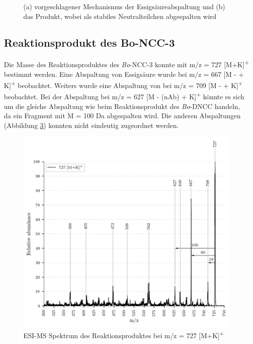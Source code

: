 \begin{figure}[!htbp]
\begin{subfigure}[b]{0.5\textwidth}
    \caption{}
    \label{fig:699MK639}
  \end{subfigure}
  \caption[Vorschlag des Mechanismus der  Abspaltung, Quelle: Autor]{(a) vorgeschlagener Mechanismus der Essigsäureabspaltung und (b) das Produkt, wobei  als stabiles Neutralteilchen abgespalten wird}
\end{figure}



\pagebreak
\subsection{Reaktionsprodukt des Bo-NCC-3}

Die Masse des Reaktionsproduktes des \textit{Bo}-NCC-3 konnte mit m/z = 727 [M+K]\textsuperscript{+} bestimmt werden. Eine Abspaltung von Essigsäure wurde bei m/z = 667 [M -  + K]\textsuperscript{+} beobachtet. Weiters wurde eine Abspaltung von  bei m/z = 709 [M -  + K]\textsuperscript{+} beobachtet. Bei der Abspaltung bei m/z = 627 [M - (\gls{nAb}) + K]\textsuperscript{+} könnte es sich um die gleiche Abspaltung wie beim Reaktionsprodukt des \textit{Bo}-DNCC handeln, da ein Fragment mit M = 100 Da abgespalten wird. Die anderen Abspaltungen (Abbildung \ref{fig:727MKLeafspray}) konnten nicht eindeutig zugeordnet werden.

\begin{figure}[!htbp]
  \centering
  \includegraphics[width=\textwidth, height=0.7\textwidth]{figures/Kapitel4/Kataboliten/VWA_MS_LeafSpray_727.png}
  \caption[ESI-MS des Reaktionsproduktes von Bo-NCC-3, Quelle: Autor]{ESI-MS Spektrum des Reaktionsproduktes bei m/z = 727 [M+K]\textsuperscript{+}}
  \label{fig:727MKLeafspray}
\end{figure}

